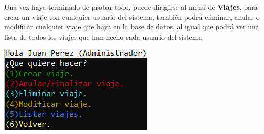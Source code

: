 Una vez haya terminado de probar todo, puede dirigirse al menú de \textbf{Viajes}, para crear un viaje con cualquier usuario del sistema, también podrá eliminar, anular o modificar
cualquier viaje que haya en la base de datos, al igual que podrá ver una lista de todos los viajes que han hecho cada usuario del sistema.
\begin{center}
  \includegraphics[]{FOTOS/menuAdminViaje.png}
\end{center}